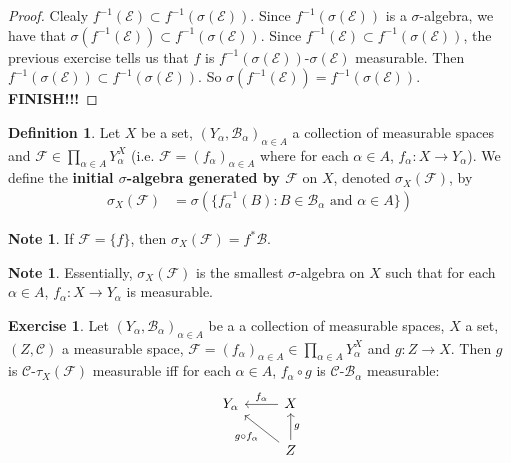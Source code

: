 \documentclass[12pt]{amsart}
\theoremstyle{definition}
\newtheorem{defn}[definition]{Definition}
\newtheorem{note}[definition]{Note}
\newtheorem{ex}[definition]{Exercise}
\newcommand{\al}{\alpha}
\newcommand{\sig}{\sigma}
\newcommand{\MC}{\mathcal{C}}
\newcommand{\MB}{\mathcal{B}}
\newcommand{\MF}{\mathcal{F}}
\newcommand{\ME}{\mathcal{E}}
\newcommand{\ld}[1]{\label{defn:#1}}
\begin{document}
	\begin{proof}
		Clealy $f^{-1}(\ME) \subset f^{-1}(\sig(\ME))$. Since $f^{-1}(\sig(\ME))$ is a $\sig$-algebra, we have that $\sig(f^{-1}(\ME)) \subset f^{-1}(\sig(\ME))$. Since $f^{-1}(\ME) \subset f^{-1}(\sig(\ME))$, the previous exercise tells us that $f$ is $f^{-1}(\sig(\ME))$-$\sig(\ME)$ measurable. Then $f^{-1}(\sig(\ME)) \subset f^{-1}(\sig(\ME))$. So $\sig(f^{-1}(\ME)) = f^{-1}(\sig(\ME))$.  \\
		\textbf{FINISH!!!}
	\end{proof}
	
	\begin{defn} \ld{}
		Let $X$ be a set, $(Y_{\al}, \MB_{\al})_{\al \in A}$ a collection of measurable spaces and $\MF \in \prod \limits_{\al \in A}Y_{\al}^X$ (i.e. $\MF = (f_{\al})_{\al \in A}$ where for each $\al \in A$, $f_{\al}:X \rightarrow Y_{\al}$). We define the \textbf{initial $\sig$-algebra generated by $\MF$} on $X$, denoted $\sig_X(\MF)$, by 
		\begin{align*}
			\sig_X(\MF) 
			&= \sig(\{f_{\al}^{-1}(B): B \in \MB_{\al} \text{ and } \al \in A \})
		\end{align*}	 
	\end{defn}
	
	\begin{note}
		If $\MF = \{f\}$, then $\sig_X(\MF) = f^*\MB$.
	\end{note}
	
	\begin{note}
		Essentially, $\sig_X(\MF)$ is the smallest $\sig$-algebra on $X$ such that for each $\al \in A$, $f_{\al}:X \rightarrow Y_{\al}$ is measurable. 
	\end{note}

	\begin{ex}
		Let $(Y_{\al}, \MB_{\al})_{\al \in A}$ be a a collection of measurable spaces, $X$ a set, $(Z, \MC)$ a measurable space, $\MF = (f_{\al})_{\al \in A} \in \prod \limits_{\al \in A}Y_{\al}^X$ and $g: Z \rightarrow X$. Then $g$ is $\MC$-$\tau_X(\MF)$ measurable iff for each $\al \in A$, $f_{\al} \circ g$ is $\MC$-$\MB_{\al}$ measurable:
		\[ \begin{tikzcd}
			Y_{\al}	
			& X  \arrow[l, "f_{\al}"'] \\
			& Z \arrow[ul, "g \circ f_{\al}"]  \arrow[u, "g"']
		\end{tikzcd}
		\]
	\end{ex}
	
\end{document}
